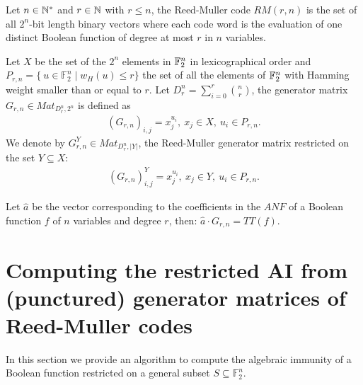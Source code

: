 \documentclass[11pt]{llncs}
\begin{document}
\begin{definition}
	Let $n\in \mathbb{N}^*$ and $r\in \mathbb{N}$ with $r\leq n$, the Reed-Muller code $RM(r,n)$ is the set of all $2^n$-bit length binary vectors where each code word is the evaluation of one distinct Boolean function of degree at most $r$ in $n$ variables.
\end{definition}



\begin{definition}\label{rmGenerator}
	Let $X$ be the set of the $2^n$ elements in $\mathbb{F}_2^n$ in lexicographical order and $P_{r,n} = \{\ u\in \mathbb{F}_2^n \mid w_H(u) \leq r\}$ the set of all the elements of $\mathbb{F}_2^n$ with Hamming weight smaller than or equal to $r$. Let $D_r^n = \sum_{i=0}^r \binom{n}{r}$, 
	the generator matrix $G_{r,n}\in Mat_{D_r^n,2^n}$ is defined as
	\begin{align*}
\left(G_{r,n}\right)_{i,j} = x_j^{u_i}, \ x_j \in X,\ u_i \in P_{r,n}.
	\end{align*}
	We denote by $G_{r,n}^Y\in Mat_{D_r^n,|Y|}$, the Reed-Muller generator matrix restricted on the set $Y \subseteq X$:
	\begin{align*}
	\left(G_{r,n}\right)^Y_{i,j} = x_j^{u_i}, \ x_j \in Y,\ u_i \in P_{r,n}.
	\end{align*}
\end{definition}

\begin{remark}
	Let $\hat{a}$ be the vector corresponding to the coefficients in the $ANF$ of a Boolean function $f$ of $n$ variables and degree $r$, then: $\hat{a} \cdot  G_{r,n} = TT(f)$.
\end{remark}


\section{Computing the restricted AI from (punctured) generator matrices of Reed-Muller codes}\label{sec:RMapproach}

In this section we provide an algorithm to compute the algebraic immunity of a Boolean function restricted on a general subset $S \subseteq \mathbb{F}_2^n$. 
\end{document}
